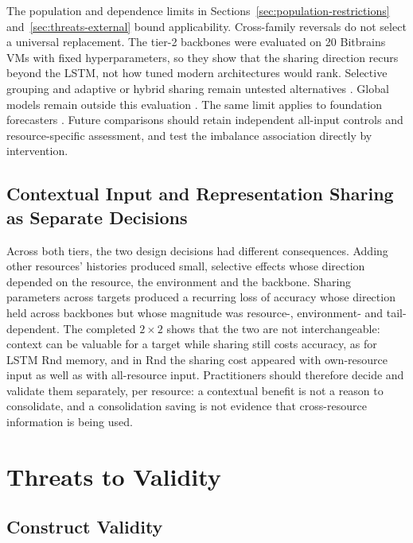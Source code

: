 \documentclass[5p,twocolumn]{elsarticle}
\begin{document}
The population and dependence limits in Sections~\ref{sec:population-restrictions}
and~\ref{sec:threats-external} bound applicability. Cross-family reversals do not
select a universal replacement. The tier-2 backbones were evaluated on 20
Bitbrains VMs with fixed hyperparameters, so they show that the sharing
direction recurs beyond the LSTM, not how tuned modern architectures would
rank. Selective grouping and adaptive or hybrid sharing remain untested
alternatives
\citep{Fifty2021TaskGroupings,Yu2020GradientSurgery,Nochumsohn2025MTLinear}.
Global models remain outside this evaluation
\citep{MonteroManso2021GlobalForecasting}.
The same limit applies to foundation forecasters
\citep{DiMenna2026RuntimeForecasting}. Future comparisons should retain
independent all-input controls and resource-specific assessment, and test
the imbalance association directly by intervention.

\subsection{Contextual Input and Representation Sharing as Separate Decisions}
\label{sec:discussion-separability}

Across both tiers, the two design decisions had different consequences.
Adding other resources' histories produced small, selective effects whose
direction depended on the resource, the environment and the backbone.
Sharing parameters across targets produced a recurring loss of accuracy
whose direction held across backbones but whose magnitude was resource-,
environment- and tail-dependent. The completed $2\times2$ shows that the two
are not interchangeable: context can be valuable for a target while sharing
still costs accuracy, as for LSTM Rnd memory, and in Rnd the sharing cost
appeared with own-resource input as well as with all-resource input. Practitioners should therefore decide
and validate them separately, per resource: a contextual benefit is not a
reason to consolidate, and a consolidation saving is not evidence that
cross-resource information is being used.

\section{Threats to Validity}
\label{sec:threats}

\subsection{Construct Validity}
\label{sec:threats-construct}
\end{document}

